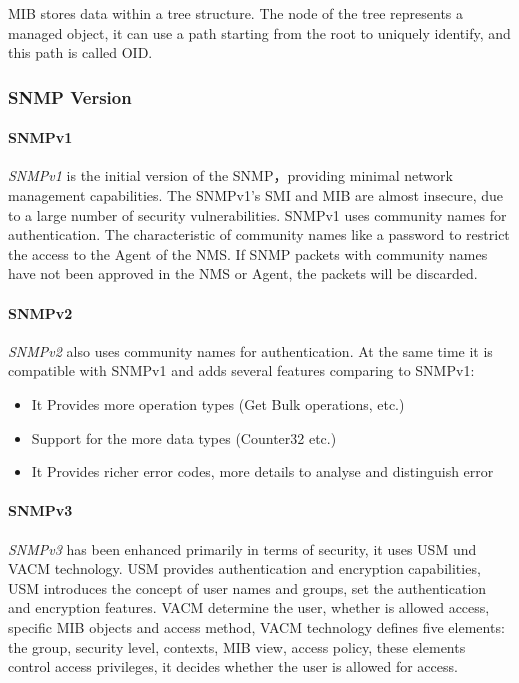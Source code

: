 MIB stores data within a tree structure. The node of the tree represents a managed object, it can use a path starting from the root to uniquely identify, and this path is called OID. 

\subsubsection{SNMP Version}

\paragraph{SNMPv1}

\textit{SNMPv1} is the initial version of the SNMP，providing minimal network management capabilities. The SNMPv1's SMI and MIB are almost insecure, due to a large number of security vulnerabilities.  
SNMPv1 uses community names for authentication. The characteristic of community names like a password to restrict the access to the Agent of the NMS. If SNMP packets with community names have not been approved in the NMS or Agent, the packets will be discarded.  

\paragraph{SNMPv2}

\textit{SNMPv2} also uses community names for authentication. At the same time it is compatible with SNMPv1 and adds several features comparing to SNMPv1:
\begin{itemize}
	\item It Provides more operation types (Get Bulk operations, etc.)
	\item Support for the more data types (Counter32 etc.)
	\item It Provides richer error codes, more details to analyse and distinguish error
\end{itemize}

\paragraph{SNMPv3}

\textit{SNMPv3} has been enhanced primarily in terms of security, it uses USM und VACM technology.  
USM provides authentication and encryption capabilities, USM introduces the concept of user names and groups, set the authentication and encryption features.  
VACM determine the user, whether is allowed access, specific MIB objects and access method, VACM technology defines five elements: the group, security level, contexts, MIB view, access policy, these elements control access privileges, it decides whether the user is allowed for access.

